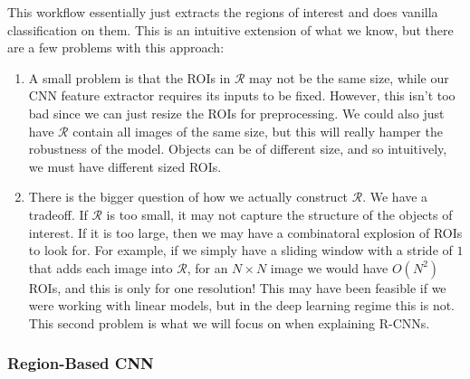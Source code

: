 \documentclass{article}
\theoremstyle{definition}
\theoremstyle{remark}
\theoremstyle{definition}
\begin{document}
This workflow essentially just extracts the regions of interest and does vanilla classification on them. This is an intuitive extension of what we know, but there are a few problems with this approach: 
\begin{enumerate}
    \item A small problem is that the ROIs in $\mathcal{R}$ may not be the same size, while our CNN feature extractor requires its inputs to be fixed. However, this isn't too bad since we can just resize the ROIs for preprocessing. We could also just have $\mathcal{R}$ contain all images of the same size, but this will really hamper the robustness of the model. Objects can be of different size, and so intuitively, we must have different sized ROIs. 
    \item There is the bigger question of how we actually construct $\mathcal{R}$. We have a tradeoff. If $\mathcal{R}$ is too small, it may not capture the structure of the objects of interest. If it is too large, then we may have a combinatoral explosion of ROIs to look for. For example, if we simply have a sliding window with a stride of $1$ that adds each image into $\mathcal{R}$, for an $N \times N$ image we would have $O(N^2)$ ROIs, and this is only for one resolution! This may have been feasible if we were working with linear models, but in the deep learning regime this is not. This second problem is what we will focus on when explaining R-CNNs. 
\end{enumerate}

\subsubsection{Region-Based CNN}
\end{document}

